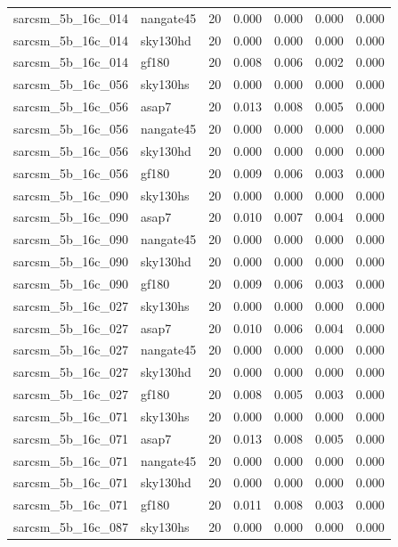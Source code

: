 \begin{tabular}{llrrrrr}
sarcsm\_5b\_16c\_014 & nangate45 & 20 & 0.000 & 0.000 & 0.000 & 0.000 \\
sarcsm\_5b\_16c\_014 & sky130hd & 20 & 0.000 & 0.000 & 0.000 & 0.000 \\
sarcsm\_5b\_16c\_014 & gf180 & 20 & 0.008 & 0.006 & 0.002 & 0.000 \\
sarcsm\_5b\_16c\_056 & sky130hs & 20 & 0.000 & 0.000 & 0.000 & 0.000 \\
sarcsm\_5b\_16c\_056 & asap7 & 20 & 0.013 & 0.008 & 0.005 & 0.000 \\
sarcsm\_5b\_16c\_056 & nangate45 & 20 & 0.000 & 0.000 & 0.000 & 0.000 \\
sarcsm\_5b\_16c\_056 & sky130hd & 20 & 0.000 & 0.000 & 0.000 & 0.000 \\
sarcsm\_5b\_16c\_056 & gf180 & 20 & 0.009 & 0.006 & 0.003 & 0.000 \\
sarcsm\_5b\_16c\_090 & sky130hs & 20 & 0.000 & 0.000 & 0.000 & 0.000 \\
sarcsm\_5b\_16c\_090 & asap7 & 20 & 0.010 & 0.007 & 0.004 & 0.000 \\
sarcsm\_5b\_16c\_090 & nangate45 & 20 & 0.000 & 0.000 & 0.000 & 0.000 \\
sarcsm\_5b\_16c\_090 & sky130hd & 20 & 0.000 & 0.000 & 0.000 & 0.000 \\
sarcsm\_5b\_16c\_090 & gf180 & 20 & 0.009 & 0.006 & 0.003 & 0.000 \\
sarcsm\_5b\_16c\_027 & sky130hs & 20 & 0.000 & 0.000 & 0.000 & 0.000 \\
sarcsm\_5b\_16c\_027 & asap7 & 20 & 0.010 & 0.006 & 0.004 & 0.000 \\
sarcsm\_5b\_16c\_027 & nangate45 & 20 & 0.000 & 0.000 & 0.000 & 0.000 \\
sarcsm\_5b\_16c\_027 & sky130hd & 20 & 0.000 & 0.000 & 0.000 & 0.000 \\
sarcsm\_5b\_16c\_027 & gf180 & 20 & 0.008 & 0.005 & 0.003 & 0.000 \\
sarcsm\_5b\_16c\_071 & sky130hs & 20 & 0.000 & 0.000 & 0.000 & 0.000 \\
sarcsm\_5b\_16c\_071 & asap7 & 20 & 0.013 & 0.008 & 0.005 & 0.000 \\
sarcsm\_5b\_16c\_071 & nangate45 & 20 & 0.000 & 0.000 & 0.000 & 0.000 \\
sarcsm\_5b\_16c\_071 & sky130hd & 20 & 0.000 & 0.000 & 0.000 & 0.000 \\
sarcsm\_5b\_16c\_071 & gf180 & 20 & 0.011 & 0.008 & 0.003 & 0.000 \\
sarcsm\_5b\_16c\_087 & sky130hs & 20 & 0.000 & 0.000 & 0.000 & 0.000 \\

\end{tabular}
